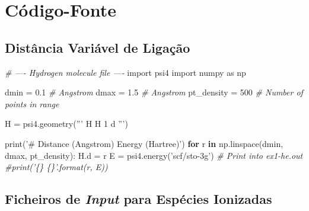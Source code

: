 \documentclass[portuguese,]{article}
\newenvironment{Shaded}{}{}
\newcommand{\BuiltInTok}[1]{#1}
\newcommand{\CommentTok}[1]{\textcolor[rgb]{0.38,0.63,0.69}{\textit{#1}}}
\newcommand{\ControlFlowTok}[1]{\textcolor[rgb]{0.00,0.44,0.13}{\textbf{#1}}}
\newcommand{\DecValTok}[1]{\textcolor[rgb]{0.25,0.63,0.44}{#1}}
\newcommand{\FloatTok}[1]{\textcolor[rgb]{0.25,0.63,0.44}{#1}}
\newcommand{\ImportTok}[1]{#1}
\newcommand{\KeywordTok}[1]{\textcolor[rgb]{0.00,0.44,0.13}{\textbf{#1}}}
\newcommand{\NormalTok}[1]{#1}
\newcommand{\OperatorTok}[1]{\textcolor[rgb]{0.40,0.40,0.40}{#1}}
\newcommand{\StringTok}[1]{\textcolor[rgb]{0.25,0.44,0.63}{#1}}
\begin{document}
\begingroup
\tiny

\endgroup

\onecolumn

\hypertarget{cuxf3digo-fonte}{%
\section{Código-Fonte}\label{cuxf3digo-fonte}}

\hypertarget{distuxe2ncia-variuxe1vel-de-ligauxe7uxe3o}{%
\subsection{Distância Variável de
Ligação}\label{distuxe2ncia-variuxe1vel-de-ligauxe7uxe3o}}

\label{code:vardist}

\begin{Shaded}
\begin{Highlighting}[]
\CommentTok{# ---- Hydrogen molecule file ----}
\ImportTok{import}\NormalTok{ psi4}
\ImportTok{import}\NormalTok{ numpy }\ImportTok{as}\NormalTok{ np}


\NormalTok{dmin }\OperatorTok{=} \FloatTok{0.1} \CommentTok{# Angstrom}
\NormalTok{dmax }\OperatorTok{=} \FloatTok{1.5} \CommentTok{# Angstrom}
\NormalTok{pt_density }\OperatorTok{=} \DecValTok{500} \CommentTok{# Number of points in range}

\NormalTok{H }\OperatorTok{=}\NormalTok{ psi4.geometry(}\StringTok{'''}
\StringTok{H}
\StringTok{H 1 d}
\StringTok{'''}\NormalTok{)}

\BuiltInTok{print}\NormalTok{(}\StringTok{'# Distance (Angstrom)    Energy (Hartree)'}\NormalTok{)}
\ControlFlowTok{for}\NormalTok{ r }\KeywordTok{in}\NormalTok{ np.linspace(dmin, dmax, pt_density):}
\NormalTok{    H.d }\OperatorTok{=}\NormalTok{ r}
\NormalTok{    E }\OperatorTok{=}\NormalTok{ psi4.energy(}\StringTok{'scf/sto-3g'}\NormalTok{)}
    \CommentTok{# Print into ex1-he.out}
    \CommentTok{#print('\{\}  \{\}'.format(r, E))}
\end{Highlighting}
\end{Shaded}

\hypertarget{ficheiros-de-input-para-espuxe9cies-ionizadas}{%
\subsection{\texorpdfstring{Ficheiros de \emph{Input} para Espécies
Ionizadas}{Ficheiros de Input para Espécies Ionizadas}}\label{ficheiros-de-input-para-espuxe9cies-ionizadas}}
\end{document}
